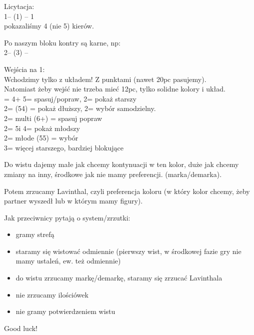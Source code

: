 \documentclass[12pt, a4paper]{article}
\begin{document}
\newpage

Licytacja:\\
1\clubs -- (1\diams) -- 1\hearts\\
pokazaliśmy 4 (nie 5) kierów.

Po naszym bloku kontry są karne, np:\\
2\spades -- (3\hearts) -- \dbl

Wejścia na 1\nt :\\
Wchodzimy tylko z układem! Z punktami (nawet 20pc pasujemy).\\
Natomiast żeby wejść nie trzeba mieć 12pc, tylko solidne kolory i układ.\\
\dbl = 4\major + 5\minor {}\clubs = spasuj/popraw, 2\diams = pokaż starszy\\
2\clubs = \major (54) \diams = pokaż dłuższy, 2\major = wybór samodzielny.\\
2\diams = multi (6+\major) \hearts = spasuj popraw\\
2\major = 5\major i 4\minor {}\nt = pokaż młodszy\\
2\nt = młode (55) \minor = wybór\\
3\major = więcej starszego, bardziej blokujące

\vspace{0.3cm}

Do wistu dajemy małe jak chcemy kontynuacji w ten kolor, duże jak chcemy zmiany na inny,
środkowe jak nie mamy preferencji. (marka/demarka).

Potem zrzucamy Lavinthal, czyli preferencja koloru (w który kolor
chcemy, żeby partner wyszedł lub w którym mamy figury).

\vspace{0.3cm}

Jak przeciwnicy pytają o system/zrzutki:
\begin{itemize}
    \item gramy strefą
    \item staramy się wistować odmiennie (pierwszy wist, w środkowej fazie gry nie mamy ustaleń, ew. też odmiennie)
    \item do wistu zrzucamy markę/demarkę, staramy się zrzucać Lavinthala
    \item nie zrzucamy ilościówek
    \item nie gramy potwierdzeniem wistu
\end{itemize}

\vspace{0.4cm}

\center
Good luck!
\end{document}
